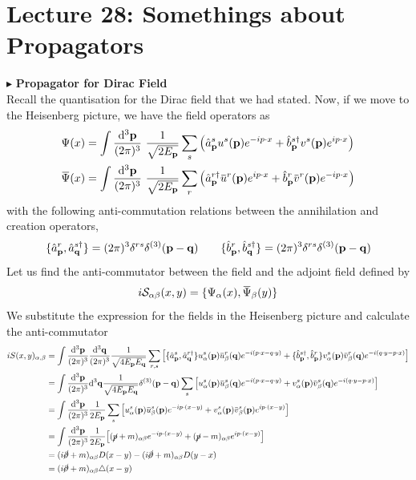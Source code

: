 \section*{Lecture 28: Somethings about Propagators}
$\blacktriangleright$ \textbf{\large Propagator for Dirac Field}\\[0.2cm]
Recall the quantisation for the Dirac field that we had stated. Now, if we move to the Heisenberg picture, we have the field operators as 
\begin{align*}
    \Psi(x) &= \int \meas{\vb{p}}\ \frac{1}{\sqrt{2E_{\vb{p}}}} \sum \limits_s \qty(\annap u^s(\vb{p}) e^{-ip\cdot x} +\crebp v^s(\vb{p}) e^{i p\cdot x})\\
    \dadj{\Psi}(x) &= \int \meas{\vb{p}}\ \frac{1}{\sqrt{2E_{\vb{p}}}} \sum \limits_r \qty(\creapr {\dadj{u}}^r(\vb{p}) e^{i p\cdot x} +\annbpr {\dadj{v}}^r(\vb{p}) e^{-i p \cdot x})
\end{align*}
with the following anti-commutation relations between the annihilation and creation operators,
$$ \{{\hat{a}_{\vb{p}}}^{r},{\hat{a}_{\vb{q}}}^{s\dagger}\} =(2\pi)^3\delta^{rs}\delta^{(3)}(\vb{p}-\vb{q})\qquad \{{\hat{b}_{\vb{p}}}^{r},{\hat{b}_{\vb{q}}}^{s\dagger}\} =(2\pi)^3\delta^{rs}\delta^{(3)}(\vb{p}-\vb{q})
$$
Let us find the anti-commutator between the field and the adjoint field defined by 
$$i\Ss_{\alpha\beta}(x,y) = \{\Psi_\alpha(x), \dadj{\Psi}_\beta(y)\}$$
We substitute the expression for the fields in the Heisenberg picture and calculate the anti-commutator
\begin{align*}
    iS(x,y)_{\alpha, \beta} &= \int \meas{\vb{p}} \meas{\vb{q}} \frac{1}{\sqrt{4 E_{\vb{p}}E_{\vb{q}}}}\sum\limits_{r,s}\qty[\{\annap , \creaqr\} u^s_\alpha(\vb{p}) \dadj{u}^r_\beta(\vb{q}) e^{-i(p\cdot x - q\cdot y )} + \{\crebp, \annbpr\}v^s_\alpha(\vb{p}) \dadj{v}^r_\beta(\vb{q}) e^{-i(q\cdot y - p\cdot x )}]\\
    &=\int \meas{\vb{p}} \dd^3 \vb{q} \frac{1}{\sqrt{4 E_{\vb{p}}E_{\vb{q}}}} \delta^{(3)}(\vb{p}-\vb{q}) \sum\limits_s \qty[ u^s_\alpha(\vb{p}) \dadj{u}^s_\beta(\vb{q}) e^{-i(p\cdot x - q\cdot y )} +v^s_\alpha(\vb{p}) \dadj{v}^s_\beta(\vb{q}) e^{-i(q\cdot y - p\cdot x )}]\\
    &=\int \meas{\vb{p}} \frac{1}{2 E_{\vb{p}}} \sum\limits_s\qty[ u^s_\alpha(\vb{p}) \dadj{u}^s_\beta(\vb{p}) e^{-i p\cdot( x - y )} +v^s_\alpha(\vb{p}) \dadj{v}^s_\beta(\vb{p}) e^{ip\cdot( x-y )}]\\
    &=\int \meas{\vb{p}} \frac{1}{2 E_{\vb{p}}} \qty[ (\gsl{p}+m)_{\alpha\beta} e^{-i p\cdot( x - y )} +(\gsl{p}-m)_{\alpha\beta} e^{ip\cdot( x-y )}]\\
    &=(i \gsl{\partial} + m )_{\alpha\beta}D(x-y)  - (i \gsl{\partial} + m )_{\alpha\beta}D(y-x)\\
    &=(i \gsl{\partial} + m )_{\alpha\beta}\triangle(x-y)
\end{align*}
